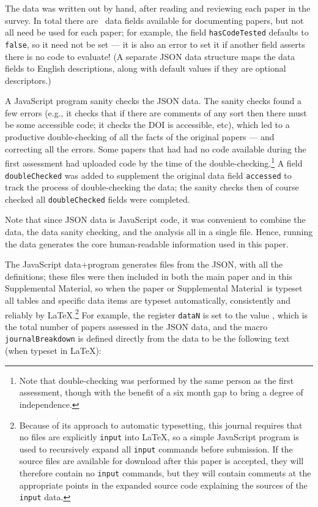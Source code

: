 \documentclass{article}
\def\supplement{Supplemental Material}
\begin{document}
The data was written out by hand, after reading and reviewing each paper in the survey. In total there are \countFields\ data fields available for documenting papers, but not all need be used for each paper; for example, the field \texttt{hasCodeTested} defaults to \texttt{false}, so it need not be set --- it is also an error to set it if another field asserts there is no code to evaluate! (A separate JSON data structure maps the data fields to English descriptions, along with default values if they are optional descriptors.)

A JavaScript program sanity checks the JSON data. The sanity checks found a few errors (e.g., it checks that if there are comments of any sort then there must be some accessible code; it checks the DOI is accessible, etc), which led to a productive double-checking of all the facts of the original papers --- and correcting all the errors. Some papers that had had no code available during the first assessment had uploaded code by the time of the double-checking.\footnote{{Note that double-checking was performed by the same person as the first assessment, though with the benefit of a six month gap to bring a degree of independence}.} A field \texttt{doubleChecked} was added to supplement the original data field \texttt{accessed} to track the process of double-checking the data; the sanity checks then of course checked all \texttt{doubleChecked} fields were completed.

Note that since JSON data is JavaScript code, it was convenient to combine the data, the data sanity checking, and the analysis all in a single file. Hence, running the data generates the core human-readable information used in this paper.

The JavaScript data+program generates files from the JSON, with all the definitions; these files were then included in both the main paper and in this \supplement, so when the paper or \supplement\ is typeset all tables and specific data items are typeset automatically, consistently and reliably by \LaTeX\@.\footnote{Because of its approach to automatic typesetting, this journal requires that no files are explicitly \texttt{input} into \LaTeX, so a simple JavaScript program is used to recursively expand all \texttt{input} commands before submission. If the source files are available for download after this paper is accepted, they will therefore contain no \texttt{input} commands, but they will contain comments at the appropriate points in the expanded source code explaining the sources of the \texttt{input} data.} For example, the register \texttt{\bslash dataN} is set to the value \the\dataN, which is the total number of papers assessed in the JSON data, and the macro \texttt{\bslash journalBreakdown} is defined directly from the data to be the following text (when typeset in \LaTeX):
\end{document}
